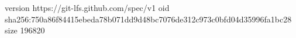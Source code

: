 version https://git-lfs.github.com/spec/v1
oid sha256:750a86f84415ebeda78b071dd9d48bc7076de312c973c0bfd04d35996fa1bc28
size 196820
